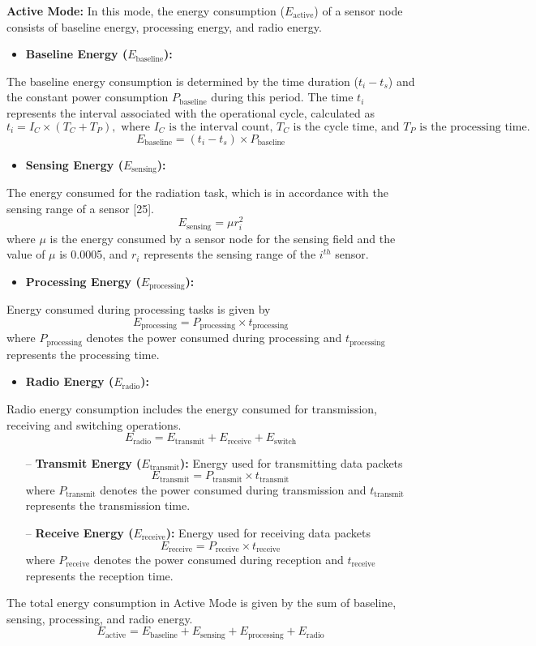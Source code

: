 \documentclass{article}
\begin{document}
\noindent\textbf{Active Mode:} In this mode, the energy consumption ($E_{\text{active}}$) of a sensor node consists of baseline energy, processing energy, and radio energy.
\begin{itemize}
    \item \textbf{Baseline Energy ($E_{\text{baseline}}$):}
\end{itemize}
The baseline energy consumption is determined by the time duration ($t_i - t_s$) and the constant power consumption $P_{\text{baseline}}$ during this period. The time $t_i$ represents the interval associated with the operational cycle, calculated as
\[
t_i = I_C \times (T_C + T_P), \text{ where } I_C \text{ is the interval count, } T_C \text{ is the cycle time, and } T_P \text{ is the processing time.}
\]
\[
E_{\text{baseline}} = (t_i - t_s) \times P_{\text{baseline}}
\]
\begin{itemize}
    \item \textbf{Sensing Energy ($E_{\text{sensing}}$):}
\end{itemize}
The energy consumed for the radiation task, which is in accordance with the sensing range of a sensor [25].
\[
E_{\text{sensing}} = \mu r_i^2
\]
where $\mu$ is the energy consumed by a sensor node for the sensing field and the value of $\mu$ is 0.0005, and $r_i$ represents the sensing range of the $i^{th}$ sensor.
\begin{itemize}
    \item \textbf{Processing Energy ($E_{\text{processing}}$):}
\end{itemize}
Energy consumed during processing tasks is given by
\[
E_{\text{processing}} = P_{\text{processing}} \times t_{\text{processing}}
\]
where $P_{\text{processing}}$ denotes the power consumed during processing and $t_{\text{processing}}$ represents the processing time.
\begin{itemize}
    \item \textbf{Radio Energy ($E_{\text{radio}}$):}
\end{itemize}
Radio energy consumption includes the energy consumed for transmission, receiving and switching operations.
\[
E_{\text{radio}} = E_{\text{transmit}} + E_{\text{receive}} + E_{\text{switch}}
\]
\begin{itemize}
    \item[\quad --] \textbf{Transmit Energy ($E_{\text{transmit}}$):} Energy used for transmitting data packets
    \[
    E_{\text{transmit}} = P_{\text{transmit}} \times t_{\text{transmit}}
    \]
    where $P_{\text{transmit}}$ denotes the power consumed during transmission and $t_{\text{transmit}}$ represents the transmission time.
    \item[\quad --] \textbf{Receive Energy ($E_{\text{receive}}$):} Energy used for receiving data packets
    \[
    E_{\text{receive}} = P_{\text{receive}} \times t_{\text{receive}}
    \]
    where $P_{\text{receive}}$ denotes the power consumed during reception and $t_{\text{receive}}$ represents the reception time.
\end{itemize}
The total energy consumption in Active Mode is given by the sum of baseline, sensing, processing, and radio energy.
\[
E_{\text{active}} = E_{\text{baseline}} + E_{\text{sensing}} + E_{\text{processing}} + E_{\text{radio}}
\]
\end{document}
